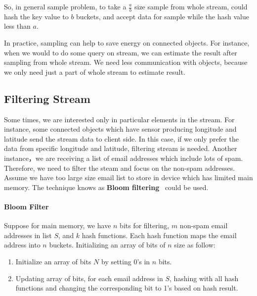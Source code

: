 So, in general sample problem, to take a $\frac{a}{b}$ size sample from whole
stream, could hash the key value to $b$ buckets, and accept data for sample
while the hash value less than $a$.~\cite{leskovec2014mining}

In practice, sampling can help to save energy on connected objects. For
instance, when we would to do some query on stream, we can estimate the result
after sampling from whole stream. We need less communication with objects,
because we only need just a part of whole stream to estimate result.  

\subsection{Filtering Stream}
Some times, we are interested only in particular elements in the stream. For
instance, some connected objects which have sensor producing longitude and
latitude send the stream data to client side. In this case, if we only prefer
the data from specific longitude and latitude, filtering stream is needed.
Another instance，we are receiving a list of email addresses which include lots
of spam. Therefore, we need to filter the steam and focus on the non-spam
addresses. Assume we have too large size email list to store in device which has
limited main memory. The technique knows as \textbf{Bloom
filtering}~\cite{bloom1970space} could be used. 
\paragraph{Bloom Filter}

Suppose for main memory, we have $n$ bits for filtering, $m$ non-spam email
addresses in list $S$, and $k$ hash functions. Each hash function maps the email
address into $n$ buckets. Initializing an array of bits of $n$ size as follow: 

\begin{enumerate}
  \item Initialize an array of bits $N$ by setting 0's in $n$ bits.
  
  \item Updating array of bits, for each email address in $S$, hashing with all
  hash functions and changing the corresponding bit to 1's based on hash result.
\end{enumerate}


